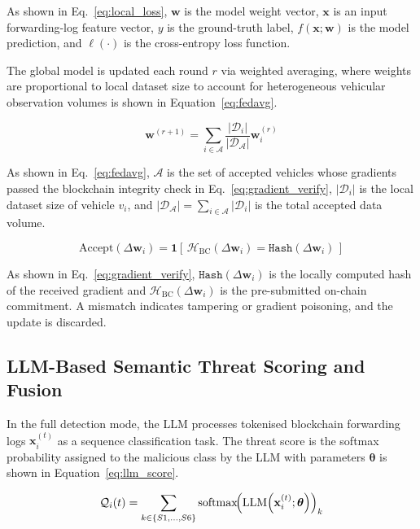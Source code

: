 \documentclass[12pt, a4paper]{report}
\begin{document}
As shown in Eq.~\eqref{eq:local_loss}, $\mathbf{w}$ is the model 
weight vector, $\mathbf{x}$ is an input forwarding-log feature vector, 
$y$ is the ground-truth label, $f(\mathbf{x};\mathbf{w})$ is the model 
prediction, and $\ell(\cdot)$ is the cross-entropy loss function.

The global model is updated each round $r$ via weighted averaging, where
weights are proportional to local dataset size to account for heterogeneous
vehicular observation volumes is shown in Equation~\eqref{eq:fedavg}.

\begin{equation}
\label{eq:fedavg}
\mathbf{w}^{(r+1)} =
\sum_{i \in \mathcal{A}} \frac{|\mathcal{D}_i|}{|\mathcal{D}_{\mathcal{A}}|}
\mathbf{w}_i^{(r)}
\end{equation}

As shown in Eq.~\eqref{eq:fedavg}, $\mathcal{A}$ is the set of 
accepted vehicles whose gradients passed the blockchain integrity 
check in Eq.~\eqref{eq:gradient_verify}, $|\mathcal{D}_i|$ is the 
local dataset size of vehicle $v_i$, and 
$|\mathcal{D}_{\mathcal{A}}| = \sum_{i \in \mathcal{A}}|\mathcal{D}_i|$ 
is the total accepted data volume.

\begin{equation}
\label{eq:gradient_verify}
\mathrm{Accept}(\Delta\mathbf{w}_i) =
\mathbf{1}\!\left[\,
\mathcal{H}_{\mathrm{BC}}(\Delta\mathbf{w}_i) =
\mathtt{Hash}(\Delta\mathbf{w}_i)
\,\right]
\end{equation}

As shown in Eq.~\eqref{eq:gradient_verify}, 
$\mathtt{Hash}(\Delta\mathbf{w}_i)$ is the locally computed hash of 
the received gradient and $\mathcal{H}_{\mathrm{BC}}(\Delta\mathbf{w}_i)$ 
is the pre-submitted on-chain commitment. A mismatch indicates 
tampering or gradient poisoning, and the update is discarded.

\subsection{LLM-Based Semantic Threat Scoring and Fusion}

In the full detection mode, the LLM processes tokenised blockchain forwarding
logs $\mathbf{x}_i^{(t)}$ as a sequence classification task. The threat score
is the softmax probability assigned to the malicious class by the LLM with
parameters $\boldsymbol{\theta}$ is shown in Equation~\eqref{eq:llm_score}.

\begin{equation}
\label{eq:llm_score}
\mathcal{Q}_i(t) =
\sum_{k \in \{S1,\ldots,S6\}}
\mathrm{softmax}\!\Bigl(
\mathrm{LLM}\!\left(\mathbf{x}_i^{(t)};\boldsymbol{\theta}\right)
\Bigr)_{k}
\end{equation}
\end{document}
